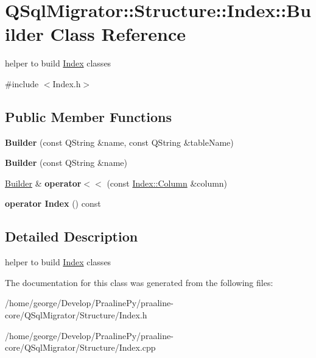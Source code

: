 \hypertarget{class_q_sql_migrator_1_1_structure_1_1_index_1_1_builder}{}\section{Q\+Sql\+Migrator\+:\+:Structure\+:\+:Index\+:\+:Builder Class Reference}
\label{class_q_sql_migrator_1_1_structure_1_1_index_1_1_builder}


helper to build \hyperlink{class_q_sql_migrator_1_1_structure_1_1_index}{Index} classes  




{\ttfamily \#include $<$Index.\+h$>$}

\subsection*{Public Member Functions}
\begin{DoxyCompactItemize}
\item 
\mbox{\label{class_q_sql_migrator_1_1_structure_1_1_index_1_1_builder_a5ccd0c7b5fac4fe4a4b717fa0d54f7af}} 
{\bfseries Builder} (const Q\+String \&name, const Q\+String \&table\+Name)
\item 
\mbox{\label{class_q_sql_migrator_1_1_structure_1_1_index_1_1_builder_a00103e732bf6cd77e1f55c2d44bb45f8}} 
{\bfseries Builder} (const Q\+String \&name)
\item 
\mbox{\label{class_q_sql_migrator_1_1_structure_1_1_index_1_1_builder_abc9757fbefe78fff24012940723c955f}} 
\hyperlink{class_q_sql_migrator_1_1_structure_1_1_index_1_1_builder}{Builder} \& {\bfseries operator$<$$<$} (const \hyperlink{class_q_sql_migrator_1_1_structure_1_1_index_1_1_column}{Index\+::\+Column} \&column)
\item 
\mbox{\label{class_q_sql_migrator_1_1_structure_1_1_index_1_1_builder_a50a86c052de4261f03649692af2e6104}} 
{\bfseries operator Index} () const
\end{DoxyCompactItemize}


\subsection{Detailed Description}
helper to build \hyperlink{class_q_sql_migrator_1_1_structure_1_1_index}{Index} classes 

The documentation for this class was generated from the following files\+:\begin{DoxyCompactItemize}
\item 
/home/george/\+Develop/\+Praaline\+Py/praaline-\/core/\+Q\+Sql\+Migrator/\+Structure/Index.\+h\item 
/home/george/\+Develop/\+Praaline\+Py/praaline-\/core/\+Q\+Sql\+Migrator/\+Structure/Index.\+cpp\end{DoxyCompactItemize}

